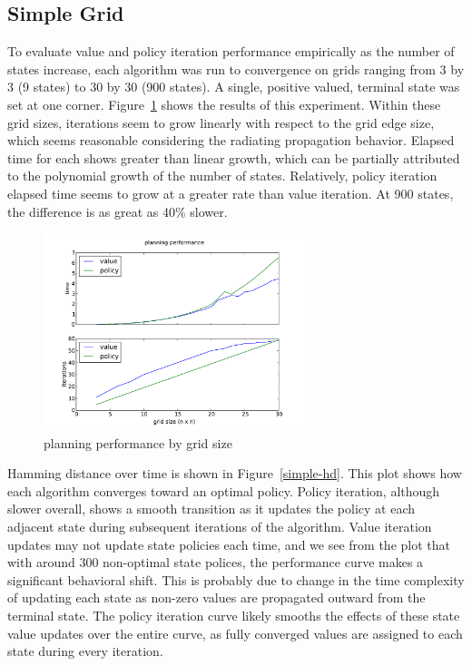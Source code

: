 \documentclass{sig-alternate}
\begin{document}
\subsection{Simple Grid}

To evaluate value and policy iteration performance empirically as the number of states increase, each algorithm was run to convergence on grids ranging from 3 by 3 (9 states) to 30 by 30 (900 states). A single, positive valued, terminal state was set at one corner. Figure~\ref{simple-planning-performance} shows the results of this experiment. Within these grid sizes, iterations seem to grow linearly with respect to the grid edge size, which seems reasonable considering the radiating propagation behavior. Elapsed time for each shows greater than linear growth, which can be partially attributed to the polynomial growth of the number of states. Relatively, policy iteration elapsed time seems to grow at a greater rate than value iteration. At 900 states, the difference is as great as 40\% slower.


\begin{figure}[!htbp]
    \centering
    \includegraphics[width=3in]{images/simple/planning-performance.pdf}
    \caption{planning performance by grid size \label{simple-planning-performance}}
\end{figure} 

Hamming distance over time is shown in Figure~\ref{simple-hd}. This plot shows how each algorithm converges toward an optimal policy. Policy iteration, although slower overall, shows a smooth transition as it updates the policy at each adjacent state during subsequent iterations of the algorithm. Value iteration updates may not update state policies each time, and we see from the plot that with around 300 non-optimal state polices, the performance curve makes a significant behavioral shift. This is probably due to change in the time complexity of updating each state as non-zero values are propagated outward from the terminal state. The policy iteration curve likely smooths the effects of these state value updates over the entire curve, as fully converged values are assigned to each state during every iteration.
\end{document}
